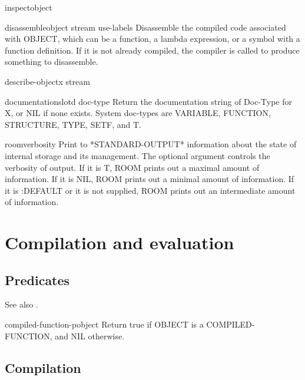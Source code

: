 \documentclass[10pt,english]{book}
\begin{document}
\begin{function}{inspect}{object}
  
\end{function}

\begin{function}{disassemble}{object \key stream use-labels}
  Disassemble the compiled code associated with OBJECT, which can be a
  function, a lambda expression, or a symbol with a function definition. If
  it is not already compiled, the compiler is called to produce something to
  disassemble.
\end{function}

\begin{generic}{describe-object}{x stream}
  
\end{generic}

\begin{generic}{documentation}{slotd doc-type}
  Return the documentation string of Doc-Type for X, or NIL if
  none exists. System doc-types are VARIABLE, FUNCTION, STRUCTURE, TYPE,
  SETF, and T.
\end{generic}

\begin{function}{room}{\op verbosity}
  Print to *STANDARD-OUTPUT* information about the state of internal
  storage and its management. The optional argument controls the
  verbosity of output. If it is T, ROOM prints out a maximal amount of
  information. If it is NIL, ROOM prints out a minimal amount of
  information. If it is :DEFAULT or it is not supplied, ROOM prints out
  an intermediate amount of information.
\end{function}


\chapter{Compilation and evaluation}
\label{cha:comp-eval}

\section{Predicates}
\label{sec:predicates-1}

See also .

\begin{function}{compiled-function-p}{object}
  Return true if OBJECT is a COMPILED-FUNCTION, and NIL otherwise.
\end{function}

\section{Compilation}
\label{sec:compilation}
\end{document}
